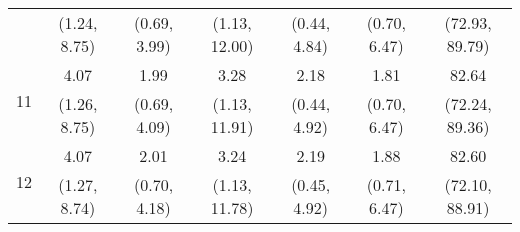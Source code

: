 \documentclass{article}
\begin{document}
\begin{table}
\begin{tabular}{ccccccc}
		 & (1.24, 8.75) & (0.69, 3.99) & (1.13, 12.00) & (0.44, 4.84) & (0.70, 6.47) & (72.93, 89.79)\\
		\multirow{2}{*}{11} & 4.07 & 1.99 & 3.28 & 2.18 & 1.81 & 82.64\\
		 & (1.26, 8.75) & (0.69, 4.09) & (1.13, 11.91) & (0.44, 4.92) & (0.70, 6.47) & (72.24, 89.36)\\
		\multirow{2}{*}{12} & 4.07 & 2.01 & 3.24 & 2.19 & 1.88 & 82.60\\
		 & (1.27, 8.74) & (0.70, 4.18) & (1.13, 11.78) & (0.45, 4.92) & (0.71, 6.47) & (72.10, 88.91)\\
	\end{tabular}
\label{tab:fevd-Model_PERR_Q_govexp-oilUSDQoq}
\end{table}
\end{document}
